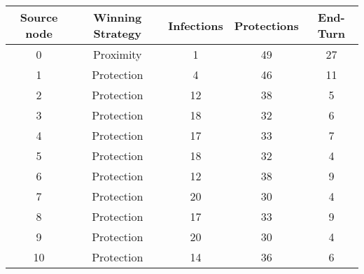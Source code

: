 \documentclass[results.tex]{subfiles}
\begin{document}
    \begin{center}
        \begin{tabular}{| c || c | c | c | c |}
            \hline
            {\bfseries Source node} & {\bfseries Winning Strategy} & {\bfseries Infections} & {\bfseries Protections}
            & {\bfseries End-Turn}
            \\  %
            \hline\hline
            0                       & Proximity                    & 1                      & 49                      & 27                   \\
            \hline
            1                       & Protection                   & 4                      & 46                      & 11                   \\
            \hline
            2                       & Protection                   & 12                     & 38                      & 5                    \\
            \hline
            3                       & Protection                   & 18                     & 32                      & 6                    \\
            \hline
            4                       & Protection                   & 17                     & 33                      & 7                    \\
            \hline
            5                       & Protection                   & 18                     & 32                      & 4                    \\
            \hline
            6                       & Protection                   & 12                     & 38                      & 9                    \\
            \hline
            7                       & Protection                   & 20                     & 30                      & 4                    \\
            \hline
            8                       & Protection                   & 17                     & 33                      & 9                    \\
            \hline
            9                       & Protection                   & 20                     & 30                      & 4                    \\
            \hline
            10                      & Protection                   & 14                     & 36                      & 6                    \\

\end{tabular}
\end{center}
\end{document}
